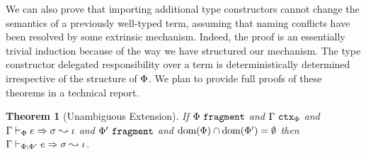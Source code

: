 \documentclass[9pt,preprint]{sigplanconf}
\newcommand{\FF}[1]{{\sf #1}}
\newtheorem{theorem}{Theorem}
\newcommand{\rulename}[1]{{\textsc{\textbf{#1}}}}
\begin{document}
We can also prove that importing additional type constructors cannot change the semantics of a previously well-typed term, assuming that naming conflicts have been resolved by some extrinsic mechanism. Indeed, the proof is an essentially trivial induction because of the way we have structured our mechanism. The type constructor delegated responsibility over a term is deterministically determined irrespective of the structure of $\Phi$. We plan to provide full proofs of these theorems in a technical report. 

\begin{theorem}[Unambiguous Extension]
If $\Phi~\mathtt{fragment}$ and $\Gamma~\mathtt{ctx}_\Phi$ and $\Gamma \vdash_\Phi e \Rightarrow \sigma \leadsto \iota$ and $\Phi'~\mathtt{fragment}$ and $\text{dom}(\Phi) \cap \text{dom}(\Phi') = \emptyset$ then ${\Gamma}\vdash_{\Phi;\Phi'}{e}\Rightarrow{\sigma}\leadsto{\iota}$.
\end{theorem}
%
%
\end{document}
